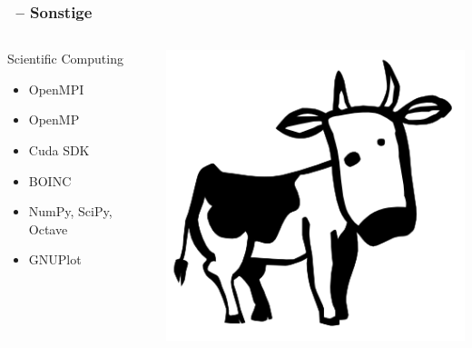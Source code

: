 \documentclass[utf8]{beamer}
\begin{document}
\begin{frame}
  \frametitle{\insertsectionhead\ -- Sonstige}
 
 
\begin{columns}
\begin{block}{Scientific Computing}
  \begin{itemize}
    \item OpenMPI
    \item OpenMP
    \item Cuda SDK
    \item BOINC
    \item NumPy, SciPy, Octave
    \item GNUPlot
    \vspace{0.5\baselineskip}
  \end{itemize}
\end{block}
\vspace{-10pt}
\begin{center}\includegraphics[scale=0.25]{media/larry_the_cow-full.png}\end{center}


\end{columns}
\end{frame}
\end{document}
